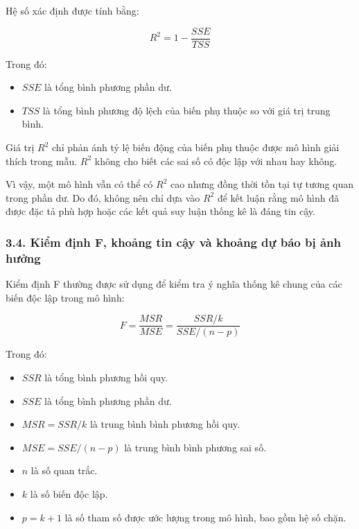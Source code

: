 Hệ số xác định được tính bằng:

\[
R^2
=
1-\frac{SSE}{TSS}
\]

Trong đó:

\begin{itemize}
    \item $SSE$ là tổng bình phương phần dư.
    
    \item $TSS$ là tổng bình phương độ lệch của biến phụ thuộc so với giá trị trung bình.
\end{itemize}

Giá trị $R^2$ chỉ phản ánh tỷ lệ biến động của biến phụ thuộc được mô hình giải thích trong mẫu. $R^2$ không cho biết các sai số có độc lập với nhau hay không.

Vì vậy, một mô hình vẫn có thể có $R^2$ cao nhưng đồng thời tồn tại tự tương quan trong phần dư. Do đó, không nên chỉ dựa vào $R^2$ để kết luận rằng mô hình đã được đặc tả phù hợp hoặc các kết quả suy luận thống kê là đáng tin cậy.


\subsubsection{3.4. Kiểm định F, khoảng tin cậy và khoảng dự báo bị ảnh hưởng}

Kiểm định F thường được sử dụng để kiểm tra ý nghĩa thống kê chung của các biến độc lập trong mô hình:

\[
F
=
\frac{MSR}{MSE}
=
\frac{SSR/k}{SSE/(n-p)}
\]

Trong đó:

\begin{itemize}
    \item $SSR$ là tổng bình phương hồi quy.
    
    \item $SSE$ là tổng bình phương phần dư.
    
    \item $MSR=SSR/k$ là trung bình bình phương hồi quy.
    
    \item $MSE=SSE/(n-p)$ là trung bình bình phương sai số.
    
    \item $n$ là số quan trắc.
    
    \item $k$ là số biến độc lập.
    
    \item $p=k+1$ là số tham số được ước lượng trong mô hình, bao gồm hệ số chặn.
\end{itemize}

